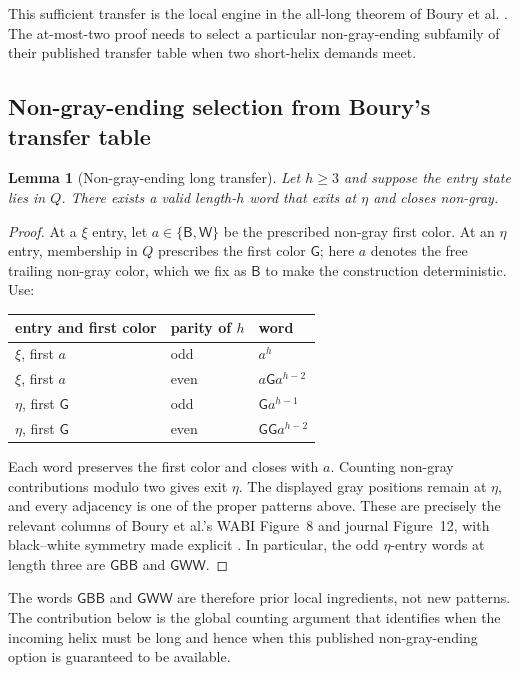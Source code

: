 \documentclass[11pt]{article}
\newtheorem{lemma}[theorem]{Lemma}
\newcommand{\Bcol}{\mathsf{B}}
\newcommand{\Wcol}{\mathsf{W}}
\newcommand{\Gray}{\mathsf{G}}
\begin{document}
This sufficient transfer is the local engine in the all-long theorem of Boury et al. \citep{boury2024,boury2025}.  The at-most-two proof needs to select a particular non-gray-ending subfamily of their published transfer table when two short-helix demands meet.

\subsection[Non-gray-ending selection from Boury's transfer table]{Non-gray-ending selection from Boury's transfer table}

\begin{lemma}[Non-gray-ending long transfer]
\label{lem:strong-long}
Let $h\ge3$ and suppose the entry state lies in $Q$.  There exists a valid length-$h$ word that exits at $\eta$ and closes non-gray.
\end{lemma}

\begin{proof}
At a $\xi$ entry, let $a\in\{\Bcol,\Wcol\}$ be the prescribed non-gray first color.  At an $\eta$ entry, membership in $Q$ prescribes the first color $\Gray$; here $a$ denotes the free trailing non-gray color, which we fix as $\Bcol$ to make the construction deterministic.  Use:
\begin{center}
\begin{tabular}{lll}
\toprule
entry and first color & parity of $h$ & word \\
\midrule
$\xi$, first $a$ & odd & $a^h$ \\
$\xi$, first $a$ & even & $a\Gray a^{h-2}$ \\
$\eta$, first $\Gray$ & odd & $\Gray a^{h-1}$ \\
$\eta$, first $\Gray$ & even & $\Gray\Gray a^{h-2}$ \\
\bottomrule
\end{tabular}
\end{center}
Each word preserves the first color and closes with $a$.  Counting non-gray contributions modulo two gives exit $\eta$.  The displayed gray positions remain at $\eta$, and every adjacency is one of the proper patterns above.  These are precisely the relevant columns of Boury et al.'s WABI Figure~8 and journal Figure~12, with black--white symmetry made explicit \citep{boury2024,boury2025}.  In particular, the odd $\eta$-entry words at length three are $\Gray\Bcol\Bcol$ and $\Gray\Wcol\Wcol$.
\end{proof}

The words $\Gray\Bcol\Bcol$ and $\Gray\Wcol\Wcol$ are therefore prior local ingredients, not new patterns.  The contribution below is the global counting argument that identifies when the incoming helix must be long and hence when this published non-gray-ending option is guaranteed to be available.
\end{document}
